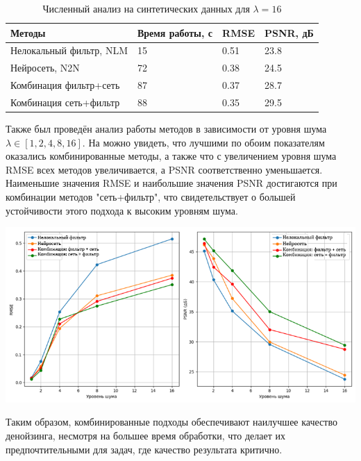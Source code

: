 \begin{table} [H]%
	\centering\small
	\caption{Численный анализ на синтетических данных для $\lambda=16$}%
	\label{tab:synthetic-denoise-16}
	\begin{tabular}{|l|l|l|l|}
		\hline
		Методы&Время работы, с&RMSE&PSNR, дБ\\
		\hline
		Нелокальный фильтр, NLM
		&15&0.51&23.8\\ \hline
		Нейросеть, N2N&72&0.38&24.5\\ \hline
		Комбинация фильтр+сеть
		&87&0.37&28.7\\ \hline Комбинация сеть+фильтр
		&88&0.35&29.5\\ \hline		
	\end{tabular}
	\normalsize%
\end{table}
\par Также был проведён анализ работы методов в зависимости от уровня шума $\lambda \in [1, 2, 4, 8, 16]$. На  можно увидеть, что лучшими по обоим показателям оказались комбинированные методы, а также что с увеличением уровня шума RMSE всех методов увеличивается, а PSNR соответственно уменьшается. Наименьшие значения RMSE и наибольшие значения PSNR достигаются при комбинации методов "сеть+фильтр", что свидетельствует о большей устойчивости этого подхода к высоким уровням шума.
\begin{minipage}{\textwidth}
	\centering
	\vspace{\mfloatsep} %
	\includegraphics[keepaspectratio=true,scale=0.57] {my_folder/images/denoising/metrics_noise.png}
	\label{fig:synthetic-denoise-16-all}  
	\vspace{\mfloatsep} %
\end{minipage}
\par Таким образом, комбинированные подходы обеспечивают наилучшее качество денойзинга, несмотря на большее время обработки, что делает их предпочтительными для задач, где качество результата критично.

